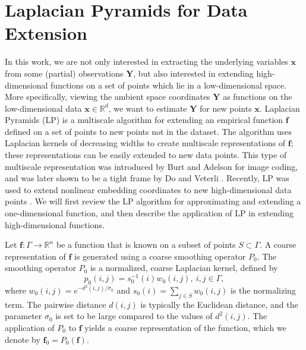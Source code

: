 \documentclass[aip,jcp,preprint]{revtex4-1}
\begin{document}
\section{Laplacian Pyramids for Data Extension} \label{sec:LapPyr}

In this work, we are not only interested in extracting the underlying variables $\mathbf{x}$ from some (partial) observations $\mathbf{Y}$,
but also interested in extending high-dimensional functions on a set of points which lie in a low-dimensional space.
%
More specifically, viewing the ambient space coordinates $\mathbf{Y}$ as functions on the low-dimensional data $\mathbf{x} \in \mathbb{R}^d$,
we want to estimate $\mathbf{Y}$ for new points $\mathbf{x}$.
%
Laplacian Pyramids (LP) is a multiscale algorithm for extending an empirical function $\mathbf{f}$ defined on a set of points
to new points not in the dataset.
%
The algorithm uses Laplacian kernels of decreasing widths to create multiscale representations of $\mathbf{f}$;
these representations can be easily extended to new data points.
%
This type of multiscale representation was introduced by Burt and Adelson \cite{burt1983laplacian} for image coding,
and was later shown to be a tight frame by Do and Veterli \cite{do2003framing}.
%
Recently, LP was used to extend nonlinear embedding coordinates to new high-dimensional data points \cite{rabin2012heterogeneous}.
%
We will first review the LP algorithm for approximating and extending a one-dimensional function,
and then describe the application of LP in extending high-dimensional functions.

Let $\mathbf{f}: \Gamma \rightarrow \mathbb{R}^n$ be a function that is known on a subset of points $S \subset \Gamma$.
%
A coarse representation of $\mathbf{f}$ is generated using a coarse smoothing operator $P_0$.
%
The smoothing operator $P_0$ is a normalized, coarse Laplacian kernel, defined by
\begin{equation}
p_0(i, j)= s_0^{-1}(i)w_0(i, j),\: i, j \in \Gamma,
\end{equation}
where $w_0(i, j)=e^{-d^2(i, j) / \sigma_0}$ and $s_0(i)=\sum_{j \in S}w_0(i, j)$ is the normalizing term.
%
The pairwise distance $d(i, j)$ is typically the Euclidean distance, and the parameter $\sigma_0$ is set to be large compared to the values of $d^2(i, j)$.
%
The application of $P_0$ to $\mathbf{f}$ yields a coarse representation of the function, which we denote by $\mathbf{f}_0=P_0(\mathbf{f})$.
\end{document}
